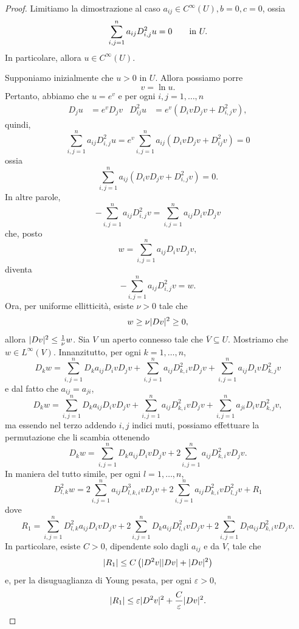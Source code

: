 \begin{proof}
	Limitiamo la dimostrazione al caso $a_{ij} \in C^\infty(U), b = 0, c=0$, ossia
	\[ \sum_{i,j=1}^{n}a_{ij}D^2_{i,j}u = 0 \qquad \textup{in } U. \]
	In particolare, allora $u \in C^\infty(U)$.
	
	Supponiamo inizialmente che $u > 0$ in $U$. Allora possiamo porre
	\[ v = \ln u. \]
	Pertanto, abbiamo che $u = e^v$ e per ogni $i,j = 1,\dots, n$
	\begin{align*}
		D_j u &= e^v D_j v & D^2_{ij}u &= e^v\left( D_i v D_j v + D^2_{i,j}v\right), 
	\end{align*}
	quindi, 
	\[ \sum_{i,j=1}^{n} a_{ij}D^2_{i,j}u = e^v \sum_{i,j=1}^n a_{ij}\left( D_ivD_jv + D^2_{ij}v\right)  = 0 \]
	ossia
	\[ \sum_{i,j=1}^{n}a_{ij}\left( D_ivD_jv + D^2_{i,j}v\right)  = 0 . \]
	In altre parole,
	\[ -\sum_{i,j=1}^{n}a_{ij}D^2_{i,j}v = \sum_{i,j=1}^{n}a_{ij}D_ivD_jv \]
	che, posto 
	\[ w =  \sum_{i,j=1}^{n}a_{ij}D_ivD_jv,\]
	diventa 
	\begin{equation}\label{eq1Harnack}
		-\sum_{i,j=1}^{n}a_{ij}D^2_{i,j}v = w.
	\end{equation}
	Ora, per uniforme ellitticità, esiste $\nu>0$ tale che 
	\[ w \ge \nu \lvert Dv\rvert^2 \ge 0, \]
	allora $\lvert Dv\rvert^2 \le \frac{1}{\nu}w$. Sia $V$ un aperto connesso tale che $\overline{V} \subseteq U$. Mostriamo che $w \in L^\infty(V)$. Innanzitutto, per ogni $k=1,\dots,n$,
	\[ D_k w = \sum_{i,j=1}^{n} D_k a_{ij} D_i v D_j v + \sum_{i,j=1}^{n} a_{ij} D^2_{k,i}v D_j v + \sum_{i,j=1}^{n} a_{ij} D_i v D^2_{k,j} v \]
	e dal fatto che $a_{ij} = a_{ji}$,
	\[ D_k w = \sum_{i,j=1}^{n} D_k a_{ij} D_i v D_j v + \sum_{i,j=1}^{n} a_{ij} D^2_{k,i}v D_j v + \sum_{i,j=1}^{n} a_{ji} D_i v D^2_{k,j} v, \]
	ma essendo nel terzo addendo $i,j$ indici muti, possiamo effettuare la permutazione che li scambia ottenendo
	\[ D_k w = \sum_{i,j=1}^{n} D_k a_{ij} D_i v D_j v + 2\sum_{i,j=1}^{n} a_{ij} D^2_{k,i}v D_j v. \]
	In maniera del tutto simile, per ogni $l = 1,\dots, n$,
	\[ D^2_{l,k} w = 2\sum_{i,j=1}^{n} a_{ij} D^3_{l,k,i}v D_j v + 2\sum_{i,j=1}^{n} a_{ij} D^2_{k,i}v D^2_{l,j}v + R_1 \]
	dove 
	\[ R_1 = \sum_{i,j=1}^{n} D^2_{l,k} a_{ij} D_i v D_j v + 2\sum_{i,j=1}^{n} D_k a_{ij} D^2_{l,i} v D_j v + 2\sum_{i,j=1}^{n} D_l a_{ij} D^2_{k,i} v D_j v. \]
	In particolare, esiste $C>0$, dipendente solo dagli $a_{ij}$ e da $V$, tale che
	\[ \lvert R_1\rvert \le C\left( \lvert D^2 v\rvert\lvert Dv\rvert + \lvert Dv\rvert^2\right)  \]
	e, per la disuguaglianza di Young pesata, per ogni $\varepsilon > 0$, 
	\[ \lvert R_1\rvert \le \varepsilon \lvert D^2v\rvert^2 + \frac{C}{\varepsilon}\lvert Dv\rvert^2. \]

\end{proof}
